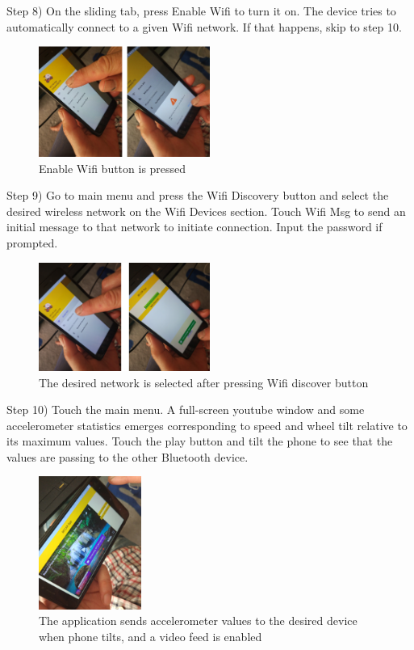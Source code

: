 Step 8) On the sliding tab, press Enable Wifi to turn it on. The device tries to automatically connect to a given Wifi network. If that happens, skip to step 10.
%
\begin{figure}[!hbt]
\centering
\includegraphics[width=0.5\textwidth]{img/val8.png}
\caption{\label{fig:val8}Enable Wifi button is pressed}
\end{figure}
%

Step 9) Go to main menu and press the Wifi Discovery button and select the desired wireless network on the Wifi Devices section. Touch Wifi Msg to send an initial message to that network to initiate connection. Input the password if prompted.
%
\begin{figure}[!hbt]
\centering
\includegraphics[width=0.5\textwidth]{img/val9.png}
\caption{\label{fig:val9}The desired network is selected after pressing Wifi discover button}
\end{figure}
%

Step 10) Touch the main menu. A full-screen youtube window and some accelerometer statistics emerges corresponding to speed and wheel tilt relative to its maximum values. Touch the play button and tilt the phone to see that the values are passing to the other Bluetooth device.
%
\begin{figure}[!hbt]
\centering
\includegraphics[width=0.3\textwidth]{img/val10.png}
\caption{\label{fig:val10}The application sends accelerometer values to the desired device when phone tilts, and a video feed is enabled}
\end{figure}
%


